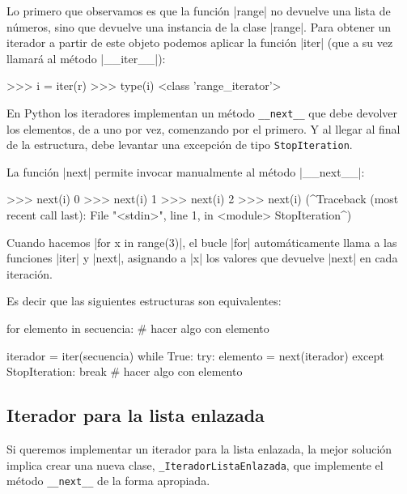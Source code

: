 Lo primero que observamos es que la función |range| no devuelve una lista de
números, sino que devuelve una instancia de la clase |range|. Para obtener un
iterador a partir de este objeto podemos aplicar la función |iter| (que a su
vez llamará al método |__iter__|):

\begin{codigo-python-sn}
>>> i = iter(r)
>>> type(i)
<class 'range_iterator'>
\end{codigo-python-sn}

En Python los iteradores implementan un método
\lstinline!__next__! que debe devolver los elementos, de a uno por vez,
comenzando por el primero.  Y al llegar al final de la estructura, debe
levantar una excepción de tipo \lstinline!StopIteration!.

La función |next| permite invocar manualmente al método |__next__|:

\begin{codigo-python-sn}
>>> next(i)
0
>>> next(i)
1
>>> next(i)
2
>>> next(i)
(^Traceback (most recent call last):
  File "<stdin>", line 1, in <module>
StopIteration^)
\end{codigo-python-sn}

Cuando hacemos |for x in range(3)|, el bucle |for| automáticamente llama a las
funciones |iter| y |next|, asignando a |x| los valores que devuelve |next| en
cada iteración.

Es decir que las siguientes estructuras son equivalentes:

\begin{codigo-python-sn}
for elemento in secuencia:
	# hacer algo con elemento
\end{codigo-python-sn}

\begin{codigo-python-sn}
iterador = iter(secuencia)
while True:
    try:
        elemento = next(iterador)
    except StopIteration:
        break
    # hacer algo con elemento
\end{codigo-python-sn}

\subsection*{Iterador para la lista enlazada}

Si queremos implementar un iterador para la lista enlazada,
la mejor solución implica crear una nueva clase,
\lstinline!_IteradorListaEnlazada!, que implemente el método
\lstinline!__next__! de la forma apropiada.

